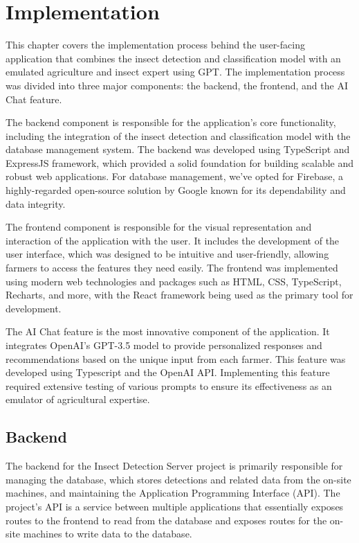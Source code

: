 
\chapter{Implementation}

This chapter covers the implementation process behind the user-facing application that combines the insect detection and classification model with an emulated agriculture and insect expert using GPT. The implementation process was divided into three major components: the backend, the frontend, and the AI Chat feature. 

The backend component is responsible for the application's core functionality, including the integration of the insect detection and classification model with the database management system. The backend was developed using TypeScript and ExpressJS framework, which provided a solid foundation for building scalable and robust web applications. For database management, we've opted for Firebase, a highly-regarded open-source solution by Google known for its dependability and data integrity.

The frontend component is responsible for the visual representation and interaction of the application with the user. It includes the development of the user interface, which was designed to be intuitive and user-friendly, allowing farmers to access the features they need easily. The frontend was implemented using modern web technologies and packages such as HTML, CSS, TypeScript, Recharts, and more, with the React framework being used as the primary tool for development.

The AI Chat feature is the most innovative component of the application. It integrates OpenAI's GPT-3.5 model to provide personalized responses and recommendations based on the unique input from each farmer. This feature was developed using Typescript and the OpenAI API. Implementing this feature required extensive testing of various prompts to ensure its effectiveness as an emulator of agricultural expertise.

\section{Backend}

The backend for the Insect Detection Server project is primarily responsible for managing the database, which stores detections and related data from the on-site machines, and maintaining the Application Programming Interface (API). The project's API is a service between multiple applications that essentially exposes routes to the frontend to read from the database and exposes routes for the on-site machines to write data to the database.

